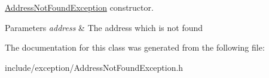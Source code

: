 \hyperlink{class_f_t_p_1_1_address_not_found_exception}{Address\-Not\-Found\-Exception} constructor. 


\begin{DoxyParams}{Parameters}
{\em address} & The address which is not found \\
\hline
\end{DoxyParams}


The documentation for this class was generated from the following file\-:\begin{DoxyCompactItemize}
\item 
include/exception/Address\-Not\-Found\-Exception.\-h\end{DoxyCompactItemize}
